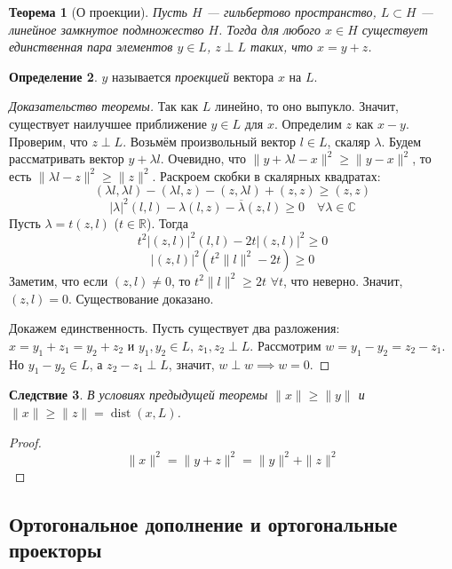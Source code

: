 \documentclass[11pt,openany,a4paper]{scrartcl}
\theoremstyle{plain}
\newtheorem{theorem}{Теорема}[subsection]
\newtheorem{corollary}[theorem]{Следствие}
\theoremstyle{definition}
\newtheorem{definition}[theorem]{Определение}
\newcommand\mb{\mathbb}
\newcommand\real{\mb R}
\newcommand{\complex}{\mb C}
\newcommand\ol{\overline}
\DeclareMathOperator{\dist}{dist}
\begin{document}
\begin{theorem}[О проекции]
    Пусть $H$ — гильбертово пространство, $L \subset H$ — линейное замкнутое 
    подмножество $H$. Тогда для любого $x \in H$ существует единственная пара
    элементов $y \in L$, $z \perp L$ таких, что $x = y + z$.
\end{theorem}
\begin{definition}
    $y$ называется \emph{проекцией} вектора $x$ на $L$.
\end{definition}
\begin{proof}[Доказательство теоремы]
    Так как $L$ линейно, то оно выпукло. Значит, существует наилучшее приближение
    $y \in L$ для $x$. Определим $z$ как $x - y$. Проверим, что $z \perp L$.
    Возьмём произвольный вектор $l \in L$, скаляр $\lambda$. Будем рассматривать
    вектор $y + \lambda l$. Очевидно, что
    $\|y + \lambda l - x\|^2 \geqslant \|y - x\|^2$, то есть
    $\|\lambda l - z\|^2 \geqslant \|z\|^2$. Раскроем скобки в скалярных 
    квадратах:
    $$
    (\lambda l, \lambda l) - (\lambda l, z) - (z, \lambda l) + (z, z) \geqslant 
    (z, z)
    $$
    $$
    |\lambda|^2(l, l) - \lambda(l, z) - \ol\lambda(z, l) \geqslant 0\quad
    \forall \lambda \in \complex
    $$
    Пусть $\lambda = t(z, l)$ ($t \in \real$). Тогда
    $$
    t^2|(z, l)|^2(l, l) - 2t|(z, l)|^2 \geqslant 0
    $$
    $$
    |(z, l)|^2(t^2\|l\|^2 - 2t)\geqslant 0
    $$
    Заметим, что если $(z, l) \neq 0$, то $t^2\|l\|^2 \geqslant 2t$ $\forall t$, что неверно.
    Значит, $(z, l) = 0$. Существование доказано.
    
    Докажем единственность. Пусть существует два разложения:
    $x = y_1 + z_1 = y_2 + z_2$ и $y_1,y_2\in L$, $z_1,z_2 \perp L$.
    Рассмотрим $w = y_1 - y_2 = z_2 - z_1$. Но $y_1 - y_2 \in L$, а
    $z_2 - z_1 \perp L$, значит, $w \perp w \implies w = 0$.
\end{proof}

\begin{corollary}
    В условиях предыдущей теоремы
    $\|x\| \geqslant \|y\|$ и $\|x\| \geqslant \|z\| = \dist(x, L)$.
\end{corollary}
\begin{proof}
    $$
    \|x\|^2 = \|y + z\|^2 = \|y\|^2 + \|z\|^2
    $$
\end{proof}

\subsection{Ортогональное дополнение и ортогональные проекторы}
\end{document}
